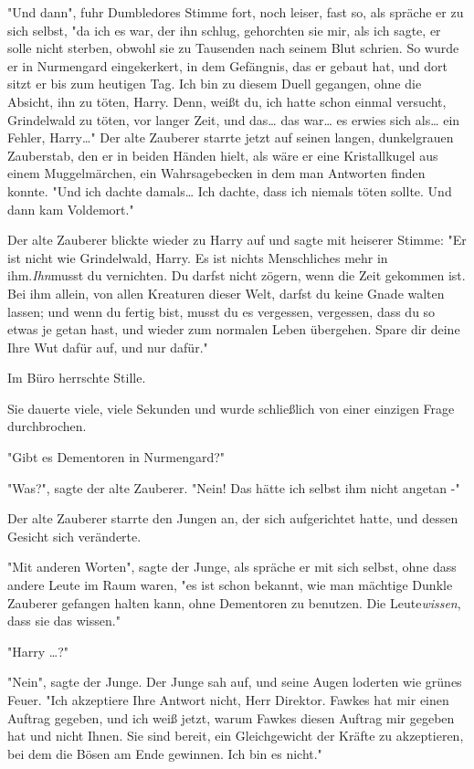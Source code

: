 {"Und dann", fuhr Dumbledores Stimme fort, noch leiser, fast so, als spräche er zu sich selbst, "da ich es war, der ihn schlug, gehorchten sie mir, als ich sagte, er solle nicht sterben, obwohl sie zu Tausenden nach seinem Blut schrien. So wurde er in Nurmengard eingekerkert, in dem Gefängnis, das er gebaut hat, und dort sitzt er bis zum heutigen Tag. Ich bin zu diesem Duell gegangen, ohne die Absicht, ihn zu töten, Harry. Denn, weißt du, ich hatte schon einmal versucht, Grindelwald zu töten, vor langer Zeit, und das… das war… es erwies sich als… ein Fehler, Harry…" Der alte Zauberer starrte jetzt auf seinen langen, dunkelgrauen Zauberstab, den er in beiden Händen hielt, als wäre er eine Kristallkugel aus einem Muggelmärchen, ein Wahrsagebecken in dem man Antworten finden konnte. "Und ich dachte damals… Ich dachte, dass ich niemals töten sollte. Und dann kam Voldemort."

Der alte Zauberer blickte wieder zu Harry auf und sagte mit heiserer Stimme: "Er ist nicht wie Grindelwald, Harry. Es ist nichts Menschliches mehr in ihm.\emph{Ihn}musst du vernichten. Du darfst nicht zögern, wenn die Zeit gekommen ist. Bei ihm allein, von allen Kreaturen dieser Welt, darfst du keine Gnade walten lassen; und wenn du fertig bist, musst du es vergessen, vergessen, dass du so etwas je getan hast, und wieder zum normalen Leben übergehen. Spare dir deine Ihre Wut dafür auf, und nur dafür."

Im Büro herrschte Stille.

Sie dauerte viele, viele Sekunden und wurde schließlich von einer einzigen Frage durchbrochen.

"Gibt es Dementoren in Nurmengard?"

"Was?", sagte der alte Zauberer. "Nein! Das hätte ich selbst ihm nicht angetan -"

Der alte Zauberer starrte den Jungen an, der sich aufgerichtet hatte, und dessen Gesicht sich veränderte.

"Mit anderen Worten", sagte der Junge, als spräche er mit sich selbst, ohne dass andere Leute im Raum waren, "es ist schon bekannt, wie man mächtige Dunkle Zauberer gefangen halten kann, ohne Dementoren zu benutzen. Die Leute\emph{wissen}, dass sie das wissen."

"Harry …?"

"Nein", sagte der Junge. Der Junge sah auf, und seine Augen loderten wie grünes Feuer. "Ich akzeptiere Ihre Antwort nicht, Herr Direktor. Fawkes hat mir einen Auftrag gegeben, und ich weiß jetzt, warum Fawkes diesen Auftrag mir gegeben hat und nicht Ihnen. Sie sind bereit, ein Gleichgewicht der Kräfte zu akzeptieren, bei dem die Bösen am Ende gewinnen. Ich bin es nicht."

}
